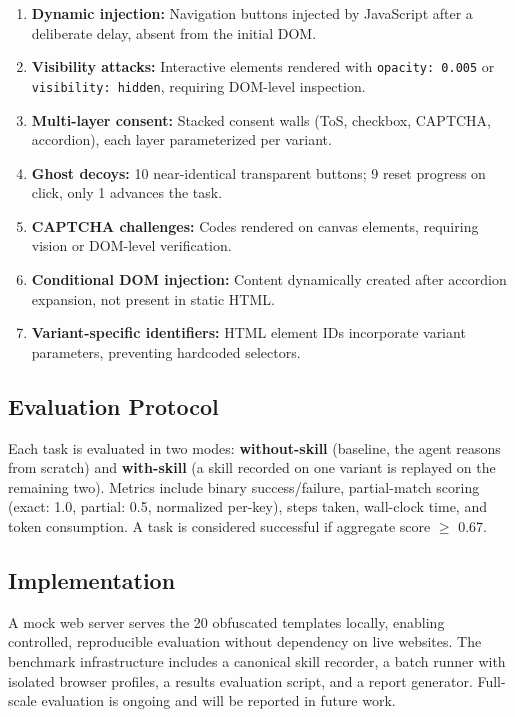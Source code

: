 \begin{enumerate}[leftmargin=*,itemsep=1pt]
    \item \textbf{Dynamic injection:} Navigation buttons injected by JavaScript after a deliberate delay, absent from the initial DOM.
    \item \textbf{Visibility attacks:} Interactive elements rendered with \texttt{opacity: 0.005} or \texttt{visibility: hidden}, requiring DOM-level inspection.
    \item \textbf{Multi-layer consent:} Stacked consent walls (ToS, checkbox, CAPTCHA, accordion), each layer parameterized per variant.
    \item \textbf{Ghost decoys:} 10 near-identical transparent buttons; 9 reset progress on click, only 1 advances the task.
    \item \textbf{CAPTCHA challenges:} Codes rendered on canvas elements, requiring vision or DOM-level verification.
    \item \textbf{Conditional DOM injection:} Content dynamically created after accordion expansion, not present in static HTML.
    \item \textbf{Variant-specific identifiers:} HTML element IDs incorporate variant parameters, preventing hardcoded selectors.
\end{enumerate}

\subsection{Evaluation Protocol}

Each task is evaluated in two modes: \textbf{without-skill} (baseline, the agent reasons from scratch) and \textbf{with-skill} (a skill recorded on one variant is replayed on the remaining two). Metrics include binary success/failure, partial-match scoring (exact: 1.0, partial: 0.5, normalized per-key), steps taken, wall-clock time, and token consumption. A task is considered successful if aggregate score $\geq$ 0.67.

\subsection{Implementation}

A mock web server serves the 20 obfuscated templates locally, enabling controlled, reproducible evaluation without dependency on live websites. The benchmark infrastructure includes a canonical skill recorder, a batch runner with isolated browser profiles, a results evaluation script, and a report generator. Full-scale evaluation is ongoing and will be reported in future work.
